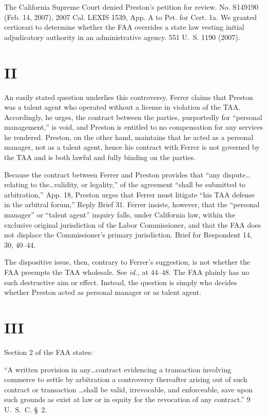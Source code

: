   The California Supreme Court denied Preston's petition for review.
No. S149190 (Feb. 14, 2007), 2007 Cal. LEXIS 1539, App. A to Pet.
for Cert. 1a. We granted certiorari to determine whether the FAA
overrides a state law vesting \newpage  initial adjudicatory authority in
an administrative agency. 551 U.~S. 1190 (2007).

\section{II}

  An easily stated question underlies this controversy. Ferrer claims
that Preston was a talent agent who operated without a license in
violation of the TAA. Accordingly, he urges, the contract between the
parties, purportedly for ``personal management,'' is void, and Preston
is entitled to no compensation for any services he rendered. Preston, on
the other hand, maintains that he acted as a personal manager, not as a
talent agent, hence his contract with Ferrer is not governed by the TAA
and is both lawful and fully binding on the parties.

  Because the contract between Ferrer and Preston provides that ``any
dispute\dots relating to the\dots validity, or legality,''
of the agreement ``shall be submitted to arbitration,'' App. 18,
Preston urges that Ferrer must litigate ``his TAA defense in the
arbitral forum,'' Reply Brief 31. Ferrer insists, however, that the
``personal manager'' or ``talent agent'' inquiry falls, under
California law, within the exclusive original jurisdiction of the Labor
Commissioner, and that the FAA does not displace the Commissioner's
primary jurisdiction. Brief for Respondent 14, 30, 40--44.

  The dispositive issue, then, contrary to Ferrer's suggestion, is not
whether the FAA preempts the TAA wholesale. See \emph{id.,} at 44--48.
The FAA plainly has no such destructive aim or effect. Instead, the
question is simply who decides whether Preston acted as personal manager
or as talent agent.

\section{III}

  Section 2 of the FAA states:

      ``A written provision in any\dots contract evidencing
    a transaction involving commerce to settle by arbitration a
    controversy thereafter arising out of such contract or transaction
   \dots shall be valid, irrevocable, and enforce\newpage able, save
    upon such grounds as exist at law or in equity for the revocation of
    any contract.'' 9 U.~S.~C. \S~2.

